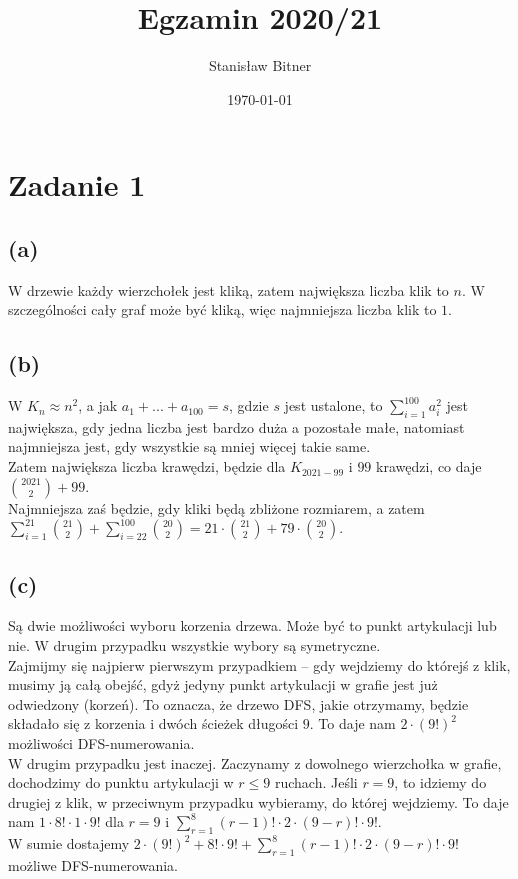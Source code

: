 \documentclass[12pt, a4paper]{article}
\title{Egzamin 2020/21}
\author{Stanisław Bitner}
\date{\today}
\begin{document}
\maketitle

\section*{Zadanie 1}
\subsection*{(a)}
W drzewie każdy wierzchołek jest kliką, zatem największa liczba klik to $n$.
W szczególności cały graf może być kliką, więc najmniejsza liczba klik to $1$.

\subsection*{(b)}
W $K_n \approx n^2$, a jak $a_1 + ... + a_{100} = s$, gdzie $s$ jest ustalone,
to $\sum_{i=1}^{100} a_i^2$ jest największa, gdy jedna liczba jest bardzo duża
a pozostałe małe, natomiast najmniejsza jest, gdy wszystkie są mniej więcej
takie same.\\ Zatem największa liczba krawędzi, będzie dla $K_{2021-99}$ i $99$
krawędzi, co daje $\binom{2021}{2} + 99$.\\ Najmniejsza zaś będzie, gdy kliki
będą zbliżone rozmiarem, a zatem\\ $\sum_{i=1}^{21} \binom{21}{2}
+ \sum_{i=22}^{100} \binom{20}{2} = 21\cdot \binom{21}{2} + 79 \cdot
\binom{20}{2}$.

\subsection*{(c)}
Są dwie możliwości wyboru korzenia drzewa. Może być to punkt artykulacji lub
nie. W drugim przypadku wszystkie wybory są symetryczne.\\ Zajmijmy się
najpierw pierwszym przypadkiem -- gdy wejdziemy do którejś z klik, musimy ją
całą obejść, gdyż jedyny punkt artykulacji w grafie jest już odwiedzony
(korzeń). To oznacza, że drzewo DFS, jakie otrzymamy, będzie składało się
z korzenia i dwóch ścieżek długości $9$. To daje nam $2 \cdot (9!)^2$
możliwości DFS-numerowania.\\ W drugim przypadku jest inaczej. Zaczynamy
z dowolnego wierzchołka w grafie, dochodzimy do punktu artykulacji w $r \le 9$
ruchach. Jeśli $r=9$, to idziemy do drugiej z klik, w przeciwnym przypadku
wybieramy, do której wejdziemy. To daje nam $1 \cdot 8! \cdot 1 \cdot 9!$ dla
$r=9$ i $\sum_{r=1}^8 (r-1)! \cdot 2 \cdot (9 - r)! \cdot 9!$.\\ W sumie
dostajemy $2 \cdot (9!)^2 + 8! \cdot 9! + \sum_{r=1}^8 (r-1)! \cdot 2 \cdot (9
- r)! \cdot 9!$ możliwe DFS-numerowania.
\end{document}
